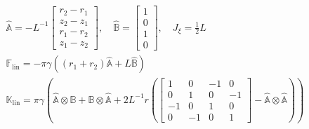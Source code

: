 \documentclass[a4paper,11pt]{article}
\renewcommand{\to}[1]{\text{\boldmath $#1$}} %
\newcommand{\uv}[1]{\mathds{#1}}
\newcommand{\um}[1]{\mathds{#1}}
\newcommand{\linear}{\mathrm{lin}}
\begin{document}
\begin{gather}
 \nonumber \hat{\uv A} = -L^{-1}\begin{bmatrix}r_2-r_1\\z_2-z_1\\r_1-r_2\\z_1-z_2\end{bmatrix}, \quad
 \hat{\uv B} = \begin{bmatrix}1\\0\\1\\0\end{bmatrix},\quad J_\xi = \frac12 L\\
 \uv F_\linear = -\pi \gamma \left((r_1+r_2)\hat{\uv A} + L\hat{\uv B}\right)\\
 \um K_\linear = \pi \gamma \left(
  \hat{\uv A}\otimes\uv B + \hat{\uv B}\otimes\hat{\uv A}
  + 2L^{-1} r \left(\begin{bmatrix}1&0&-1&0\\0&1&0&-1\\-1&0&1&0\\0&-1&0&1\end{bmatrix} - \hat{\uv A}\otimes\hat{\uv A}\right)
  \right)
\end{gather}
\end{document}
